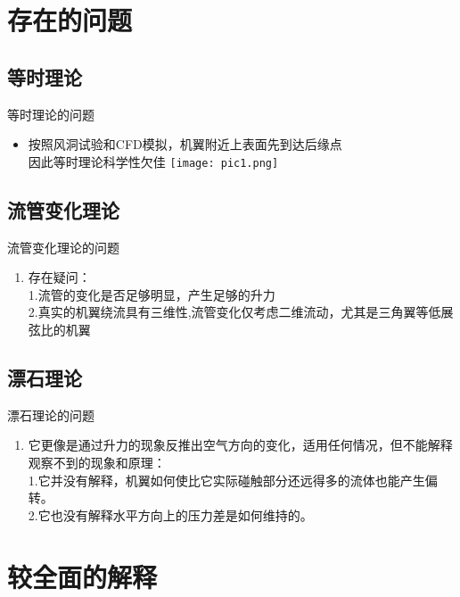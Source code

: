 \documentclass{beamer}
\begin{document}
	\section{存在的问题}
	    \subsection{等时理论}
	
		\begin{frame}{等时理论的问题}
		\begin{itemize}
			\item 按照风洞试验和CFD模拟，机翼附近上表面先到达后缘点\\
			因此等时理论科学性欠佳
			\texttt{[image: pic1.png]}
		\end{itemize}

		\end{frame}
	
		\subsection{流管变化理论}	
		\begin{frame}{流管变化理论的问题}
		\begin{enumerate}
			\item 存在疑问：\\
			1.流管的变化是否足够明显，产生足够的升力\\
			2.真实的机翼绕流具有三维性,流管变化仅考虑二维流动，尤其是三角翼等低展弦比的机翼
		\end{enumerate}
		\end{frame}

		\subsection{漂石理论}	
		\begin{frame}{漂石理论的问题}
		\begin{enumerate}
			\item 它更像是通过升力的现象反推出空气方向的变化，适用任何情况，但不能解释观察不到的现象和原理：\\
			1.它并没有解释，机翼如何使比它实际碰触部分还远得多的流体也能产生偏转。\\
			2.它也没有解释水平方向上的压力差是如何维持的。	
		\end{enumerate}
		\end{frame}
	\section{较全面的解释}
\end{document}
